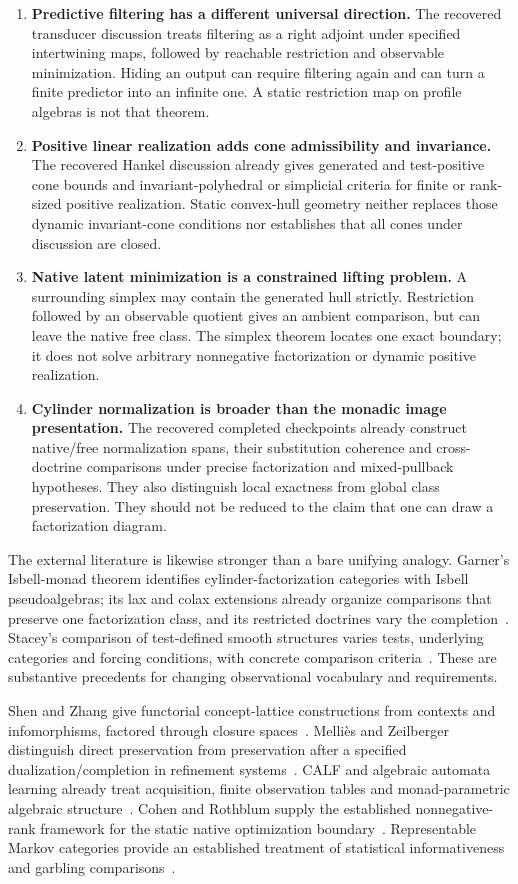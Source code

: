 \documentclass[11pt]{article}
\begin{document}
\begin{enumerate}
\item \textbf{Predictive filtering has a different universal direction.} The recovered transducer discussion treats filtering as a right adjoint under specified intertwining maps, followed by reachable restriction and observable minimization. Hiding an output can require filtering again and can turn a finite predictor into an infinite one. A static restriction map on profile algebras is not that theorem.
\item \textbf{Positive linear realization adds cone admissibility and invariance.} The recovered Hankel discussion already gives generated and test-positive cone bounds and invariant-polyhedral or simplicial criteria for finite or rank-sized positive realization. Static convex-hull geometry neither replaces those dynamic invariant-cone conditions nor establishes that all cones under discussion are closed.
\item \textbf{Native latent minimization is a constrained lifting problem.} A surrounding simplex may contain the generated hull strictly. Restriction followed by an observable quotient gives an ambient comparison, but can leave the native free class. The simplex theorem locates one exact boundary; it does not solve arbitrary nonnegative factorization or dynamic positive realization.
\item \textbf{Cylinder normalization is broader than the monadic image presentation.} The recovered completed checkpoints already construct native/free normalization spans, their substitution coherence and cross-doctrine comparisons under precise factorization and mixed-pullback hypotheses. They also distinguish local exactness from global class preservation. They should not be reduced to the claim that one can draw a factorization diagram.
\end{enumerate}

The external literature is likewise stronger than a bare unifying analogy. Garner's Isbell-monad theorem identifies cylinder-factorization categories with Isbell pseudoalgebras; its lax and colax extensions already organize comparisons that preserve one factorization class, and its restricted doctrines vary the completion~\cite{Garner}. Stacey's comparison of test-defined smooth structures varies tests, underlying categories and forcing conditions, with concrete comparison criteria~\cite{Stacey}. These are substantive precedents for changing observational vocabulary and requirements.

Shen and Zhang give functorial concept-lattice constructions from contexts and infomorphisms, factored through closure spaces~\cite{ShenZhang}. Melli\`es and Zeilberger distinguish direct preservation from preservation after a specified dualization/completion in refinement systems~\cite{MelliesZeilberger}. CALF and algebraic automata learning already treat acquisition, finite observation tables and monad-parametric algebraic structure~\cite{CALF,UrbatSchroeder}. Cohen and Rothblum supply the established nonnegative-rank framework for the static native optimization boundary~\cite{CohenRothblum}. Representable Markov categories provide an established treatment of statistical informativeness and garbling comparisons~\cite{FritzEtAl}.
\end{document}
